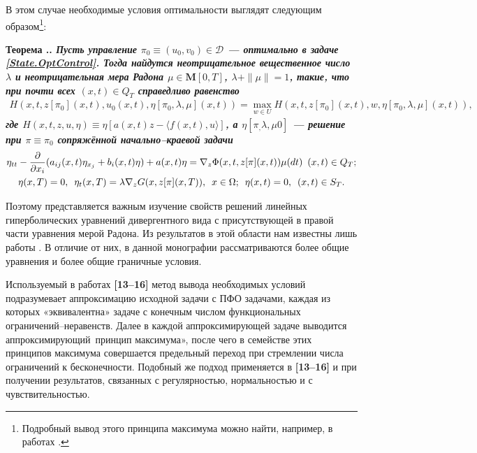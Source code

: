\documentclass{report}
\newcounter{rem}[section]
\newcounter{lem}[section]
\newcounter{theor}[section]
\renewcommand{\thetheor}{\thesection.\arabic{theor}}
\newenvironment{Theorem}{\par\refstepcounter{theor}\bf Теорема \thetheor. \it}{\rm\par}
\begin{document}
В этом случае необходимые условия оптимальности выглядят следующим образом\footnote{Подробный вывод этого принципа максимума можно найти, например, в работах
\cite{GavrilovSumin2008,GavrilovSumin2013-1,GavrilovSumin2013-2}.}:
\begin{Theorem}
Пусть управление $\pi_0\equiv(u_0,v_0)\in\mathcal{D}$ --- оптимально в задаче \eqref{State.OptControl}. Тогда найдутся неотрицательное вещественное число $\lambda$ и неотрицательная мера
Радона $\mu\in\mathbf{M}[0,T]$, $\lambda+\|\mu\|=1$, такие, что при почти всех $(x,t)\in Q_T$ справедливо равенство
\begin{gather}\label{State.OptControl!maximum.principle}
H(x,t,z[\pi_0](x,t),u_0(x,t),\eta[\pi_0,\lambda,\mu](x,t))=\max\limits_{w\in U}H(x,t,z[\pi_0](x,t),w,\eta[\pi_0,\lambda,\mu](x,t)),
\end{gather}
где $H(x,t,z,u,\eta)\equiv\eta[a(x,t)z-\langle f(x,t),u\rangle]$, а $\eta[\pi_,\lambda,\mu0]$ --- решение при $\pi\equiv\pi_0$ сопряжённой начально--краевой задачи
\begin{gather}\label{State.OptControl!adjoint.problem}
\eta_{tt}-\frac{\partial}{\partial x_i}(a_{ij}(x,t)\eta_{x_j}+b_i(x,t)\eta)+a(x,t)\eta=\nabla_z\Phi(x,t,z[\pi](x,t))\mu(dt)\,\,\,(x,t)\in Q_T;\\
\notag \eta(x,T)=0,\,\,\,\eta_t(x,T)=\lambda\nabla_zG(x,z[\pi](x,T)),\,\,\,x\in\Omega;\,\,\,\eta(x,t)=0,\,\,\,(x,t)\in S_T.
\end{gather}
\end{Theorem}

Поэтому представляется важным изучение свойств решений линейных гиперболических уравнений дивергентного вида с присутствующей в правой части уравнения мерой Радона. Из результатов в этой
области нам известны лишь работы \cite{MR1,MR2}. В отличие от них, в данной монографии рассматриваются более общие уравнения и более общие граничные условия.

Используемый в работах \textbf{[13–16]} метод вывода необходимых условий подразумевает аппроксимацию исходной задачи с ПФО задачами, каждая из которых «эквивалентна» задаче с
конечным числом функциональных ограничений--неравенств. Далее в каждой аппроксимирующей задаче выводится \glqq аппроксимирующий\grqq\ принцип максимума», после чего в семействе
этих принципов максимума совершается предельный переход при стремлении числа ограничений к бесконечности. Подобный же подход применяется в \textbf{[13–16]} и при получении результатов,
связанных с регулярностью, нормальностью и с чувствительностью.
\end{document}
